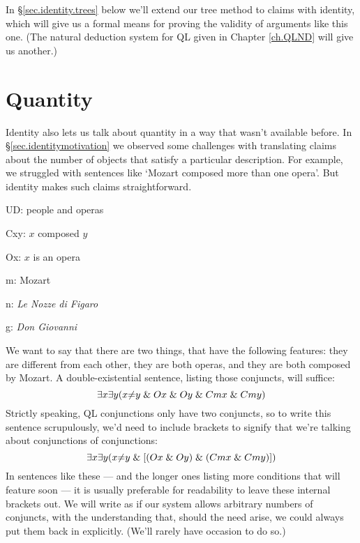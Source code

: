 In \S\ref{sec.identity.trees} below we'll extend our tree method to claims with identity, which will give us a formal means for proving the validity of arguments like this one. (The natural deduction system for QL given in Chapter \ref{ch.QLND} will give us another.)





\section{Quantity}
\label{sec.quantity}

Identity also lets us talk about quantity in a way that wasn't available before. In \S\ref{sec.identitymotivation} we observed some challenges with translating claims about the number of objects that satisfy a particular description. For example, we struggled with sentences like `Mozart composed more than one opera'. But identity makes such claims straightforward.

\begin{ekey}
\item[UD:] people and operas
\item[Cxy:] $x$ composed $y$
\item[Ox:] $x$ is an opera
\item[m:] Mozart
\item[n:] \emph{Le Nozze di Figaro}
\item[g:] \emph{Don Giovanni}
\end{ekey}

We want to say that there are two things, that have the following features: they are different from each other, they are both operas, and they are both composed by Mozart. A double-existential sentence, listing those conjuncts, will suffice: 
$$\exists x \exists y (x {\neq} y \mathrel\& Ox \mathrel\& Oy \mathrel\& Cmx \mathrel\& Cmy)$$
Strictly speaking, QL conjunctions only have two conjuncts, so to write this sentence scrupulously, we'd need to include brackets to signify that we're talking about conjunctions of conjunctions:
$$\exists x \exists y (x {\neq} y \mathrel\& [(Ox \mathrel\& Oy) \mathrel\& (Cmx \mathrel\& Cmy)])$$
In sentences like these --- and the longer ones listing more conditions that will feature soon --- it is usually preferable for readability to leave these internal brackets out. We will write as if our system allows arbitrary numbers of conjuncts, with the understanding that, should the need arise, we could always put them back in explicitly. (We'll rarely have occasion to do so.)

